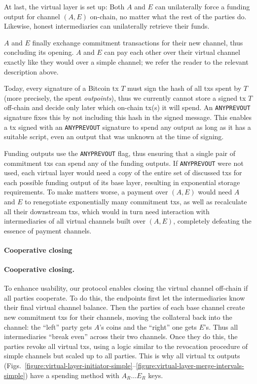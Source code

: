   At last, the virtual layer is set up: Both $A$ and $E$ can unilaterally
  force a funding output for channel $(A, E)$ on-chain, no matter what the rest
  of the parties do. Likewise, honest intermediaries can
  unilaterally retrieve their funds.

  $A$ and $E$ finally exchange
  commitment transactions for their new channel, thus concluding its opening.
  $A$ and $E$ can pay each other over their virtual channel exactly like
  they would over a simple channel; we refer the reader to the relevant
  description above.

Today, every signature
of a Bitcoin tx $T$ must sign the hash of all txs spent by
$T$ (more precisely, the spent \emph{outpoints}), thus we currently cannot
store a signed tx $T$ off-chain and decide only later which on-chain
tx(s) it will spend. An \texttt{ANYPREVOUT} signature fixes this by
not including this hash in the signed message. This enables a tx
signed with an \texttt{ANYPREVOUT} signature to spend any output as long as it
has a suitable script, even an output that was unknown at the time of signing.

  Funding outputs use the \texttt{ANYPREVOUT} flag, thus ensuring
  that a single pair of commitment txs can spend any of the funding outputs. If
  \texttt{ANYPREVOUT} were not used, each virtual layer would need a copy of the
  entire set of discussed txs for each possible funding output of its base
  layer, resulting in exponential storage requirements. To make matters worse,
  a payment over $(A, E)$ would need $A$ and $E$ to renegotiate exponentially
  many commitment txs, as well as recalculate all their downstream txs, which
  would in turn need interaction with intermediaries of all virtual channels
  built over $(A, E)$, completely defeating the essence of payment channels.

  \makeatletter%
    {\paragraph{Cooperative closing}}%
    {\paragraph{Cooperative closing.}}%
  \makeatother%
  To enhance usability, our protocol enables closing the virtual channel
  off-chain if all parties cooperate. To do this, the endpoints first
  let the intermediaries know their final virtual channel balance. Then the
  parties of each base channel create new commitment txs for their channels,
  moving the collateral back into the channel: the ``left'' party gets $A$'s
  coins and the ``right'' one gets $E$'s. Thus all intermediaries ``break even''
  across their two channels. Once they do this, the parties revoke all virtual
  txs, using a logic similar to the revocation procedure of simple channels but
  scaled up to all parties. This is why all virtual tx outputs
  (Figs.~\ref{figure:virtual-layer-initiator-simple}--\ref{figure:virtual-layer-merge-intervals-simple})
  have a spending method with $A_R \dots E_R$ keys.

